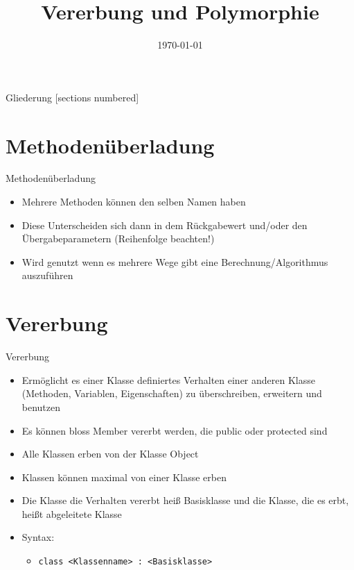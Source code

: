 



\title{Vererbung und Polymorphie}
\date{\today}




\maketitle

\begin{frame}{Gliederung}
	[sections numbered]
	\tableofcontents
\end{frame}

\section{Methodenüberladung}
\begin{frame}{Methodenüberladung}
	\begin{itemize}
		\item Mehrere Methoden können den selben Namen haben
		\item Diese Unterscheiden sich dann in dem Rückgabewert und/oder den Übergabeparametern (Reihenfolge beachten!) 
		\item Wird genutzt wenn es mehrere Wege gibt eine Berechnung/Algorithmus auszuführen
	\end{itemize}
	
\end{frame}

\section{Vererbung}
\begin{frame}{Vererbung}
	\begin{itemize}
		\item Ermöglicht es einer Klasse definiertes Verhalten einer anderen Klasse (Methoden, Variablen, Eigenschaften) zu überschreiben, erweitern und benutzen
		\item Es können bloss Member vererbt werden, die \alert{public} oder \alert{protected} sind
		\item Alle Klassen erben von der Klasse \alert{Object}
		\item Klassen können maximal von einer Klasse erben
		\item Die Klasse die Verhalten vererbt heiß \alert{Basisklasse} und die Klasse, die es erbt, heißt \alert{abgeleitete Klasse}
		\item Syntax:
		\begin{itemize}
			\item \texttt{class \alert{<Klassenname>} : \alert{<Basisklasse>}}
		\end{itemize}
	\end{itemize}
	
\end{frame}

